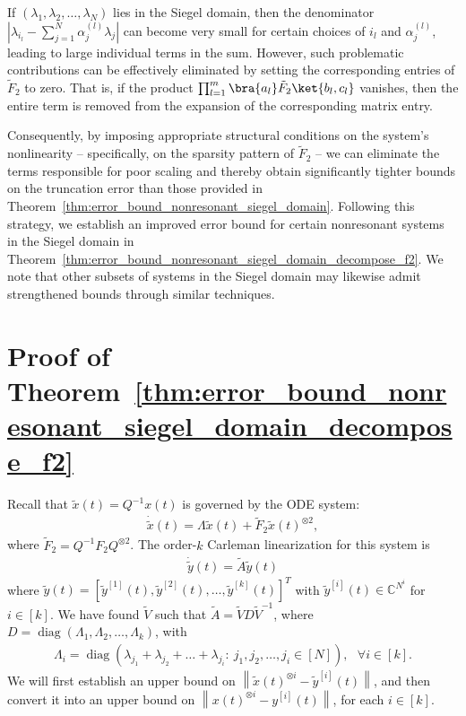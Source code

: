 \documentclass[superscriptaddress,onecolumn,nofootinbib,longbibliography,a4paper,accepted=2026-09-29]{quantumarticle}
\theoremstyle{plain}
\theoremstyle{definition}
\numberwithin{thm}{section}
\numberwithin{assumption}{section}
\numberwithin{lemma}{section}
\numberwithin{prop}{section}
\numberwithin{cor}{section}
\numberwithin{definition}{section}
\numberwithin{rmk}{section}
\numberwithin{equation}{section}
\newcommand{\norm}[1]     {\left\| #1 \right\|}
\newcommand{\myC}{\mathbb{C}}
\newcommand{\lrb}[1]{\left ( #1 \right )}
\newcommand{\diag}[1]{\operatorname{diag}\lrb{#1}}
\begin{document}
If $(\lambda_1, \lambda_2, \dots, \lambda_N)$ lies in the Siegel domain, then the denominator $\left|\lambda_{i_l} - \sum_{j=1}^N \alpha_j^{(l)} \lambda_j\right|$ can become very small for certain choices of $i_l$ and $\alpha_j^{(l)}$, leading to large individual terms in the sum. However, such problematic contributions can be effectively eliminated by setting the corresponding entries of $\tilde{F}_2$ to zero. That is, if the product $\prod_{l=1}^m \bra{a_l}\tilde{F}_2\ket{b_l, c_l}$ vanishes, then the entire term is removed from the expansion of the corresponding matrix entry.

Consequently, by imposing appropriate structural conditions on the system’s nonlinearity -- specifically, on the sparsity pattern of $\tilde{F}_2$ -- we can eliminate the terms responsible for poor scaling and thereby obtain significantly tighter bounds on the truncation error than those provided in Theorem~\ref{thm:error_bound_nonresonant_siegel_domain}. Following this strategy, we establish an improved error bound for certain nonresonant systems in the Siegel domain in Theorem~\ref{thm:error_bound_nonresonant_siegel_domain_decompose_f2}. We note that other subsets of systems in the Siegel domain may likewise admit strengthened bounds through similar techniques.


\section{Proof of Theorem~\ref{thm:error_bound_nonresonant_siegel_domain_decompose_f2}}
\label{app:error_bound_nonresonant_siegel_domain_decompose_f2}


Recall that $\tilde{x}(t)=Q^{-1}x(t)$ is governed by the ODE system:
\begin{align}
\dot{\tilde{x}}(t) = \Lambda \tilde{x}(t) + \tilde{F}_2 \tilde{x}(t)^{\otimes 2},   
\end{align}
where $\tilde{F}_2 = Q^{-1}F_2 Q^{\otimes 2}$. The order-$k$ Carleman linearization for this system is  
\begin{align}
\dot{\tilde{y}}(t) =\tilde{A}\tilde{y}(t)    
\end{align}
 where $\tilde{y}(t)=[\tilde{y}^{[1]}(t), \tilde{y}^{[2]}(t),\dots,\tilde{y}^{[k]}(t)]^T$ with $\tilde{y}^{[i]}(t) \in \myC^{N^i}$ for $i \in [k]$. We have found $\tilde{V}$ such that $\tilde{A}=\tilde{V}D\tilde{V}^{-1}$, where $D=\diag{\Lambda_1, \Lambda_2, \dots, \Lambda_k}$, 
with
\begin{align}
\Lambda_i=\diag{\lambda_{j_1}+\lambda_{j_2}+\dots+\lambda_{j_i}:~j_1,j_2,\dots,j_i \in [N]}, ~~~\forall i \in [k].
\end{align}
We will first establish an upper bound on $\norm{\tilde{x}(t)^{\otimes i}-\tilde{y}^{[i]}(t)}$, and then convert it into an upper bound on $\norm{x(t)^{\otimes i}-y^{[i]}(t)}$, for each $i \in [k]$.
\end{document}
